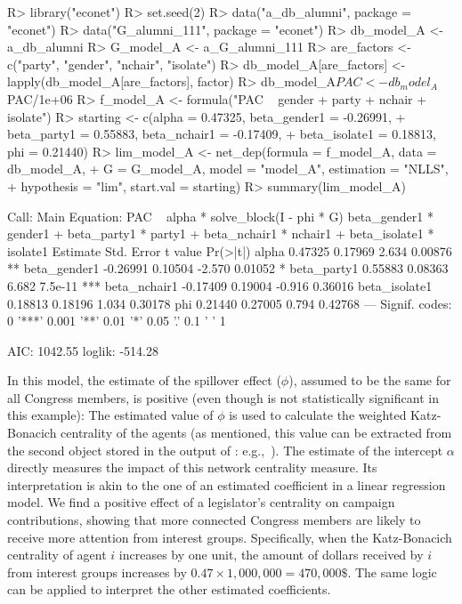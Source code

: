 \documentclass[nojss]{jss}
\begin{document}
\begin{CodeChunk}
\begin{CodeInput}
R> library("econet")
R> set.seed(2)	
R> data("a_db_alumni", package = "econet")
R> data("G_alumni_111", package = "econet")
R> db_model_A <- a_db_alumni
R> G_model_A <- a_G_alumni_111
R> are_factors <- c("party", "gender", "nchair", "isolate")
R> db_model_A[are_factors] <- lapply(db_model_A[are_factors], factor)
R> db_model_A$PAC <- db_model_A$PAC/1e+06
R> f_model_A <- formula("PAC ~ gender + party + nchair + isolate")
R> starting <- c(alpha = 0.47325, beta_gender1 = -0.26991,
+    beta_party1 = 0.55883, beta_nchair1 = -0.17409,
+    beta_isolate1 = 0.18813, phi = 0.21440)
R> lim_model_A <- net_dep(formula = f_model_A, data = db_model_A,
+    G = G_model_A, model = "model_A", estimation = "NLLS",
+    hypothesis = "lim", start.val = starting)
R> summary(lim_model_A)
\end{CodeInput}
\begin{CodeOutput}
Call:
Main Equation: PAC ~ alpha * solve_block(I - phi * G) %
beta_gender1 * gender1 + beta_party1 * party1 + 
beta_nchair1 * nchair1 + beta_isolate1 * isolate1
              Estimate Std. Error t value Pr(>|t|)    
alpha          0.47325    0.17969   2.634  0.00876 ** 
beta_gender1  -0.26991    0.10504  -2.570  0.01052 *  
beta_party1    0.55883    0.08363   6.682  7.5e-11 ***
beta_nchair1  -0.17409    0.19004  -0.916  0.36016    
beta_isolate1  0.18813    0.18196   1.034  0.30178    
phi            0.21440    0.27005   0.794  0.42768    
---
Signif. codes:  0 '***' 0.001 '**' 0.01 '*' 0.05 '.' 0.1 ' ' 1

AIC: 1042.55  loglik: -514.28
\end{CodeOutput}
\end{CodeChunk}
%
In this model, the estimate of the spillover effect ($\phi$), assumed to be
the same for all Congress members, is positive (even though is not
statistically significant in this example): The estimated value of $\phi$ is
used to calculate the weighted Katz-Bonacich centrality of the agents (as
mentioned, this value can be extracted from the second object stored in the
output of : e.g.,~).  The
estimate of the intercept $\alpha$ directly measures the impact of this
network centrality measure.  Its interpretation is akin to the one of an
estimated coefficient in a linear regression model.  We find a positive
effect of a legislator's centrality on campaign contributions, showing that
more connected Congress members are likely to receive more attention from
interest groups.  Specifically, when the Katz-Bonacich centrality of agent
$i$ increases by one unit, the amount of dollars received by
$i$ from interest groups increases by $0.47\times 1,000,000 = 470,000\$$. 
The same logic can be applied to interpret the other estimated coefficients.
\end{document}
